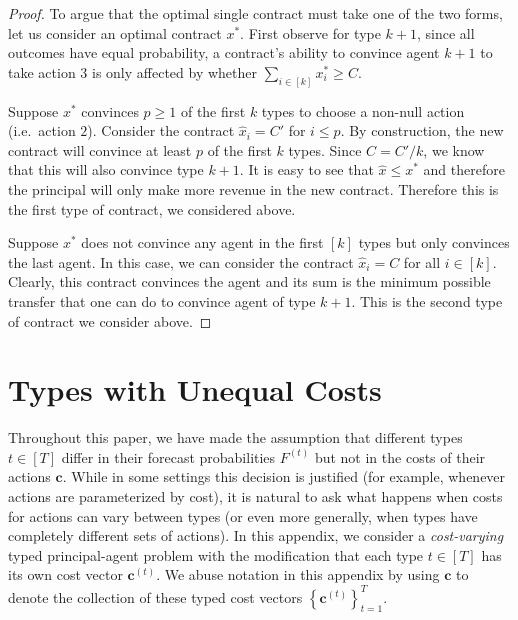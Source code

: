 \documentclass{article}
\newcommand{\CostVector}{\bm{c}}
\newcommand{\TypedCostVector}[1]{\bm{c}^{(#1)}}
\newcommand{\TypedForecastMatrix}[1]{F^{(#1)}}
\begin{document}
\begin{proof}
To argue that the optimal single contract must take one of the two forms, let us consider 
an optimal contract $x^*$. First observe 
for type $k+1$, since all outcomes have equal probability, a contract's ability to convince 
agent $k+1$ to take action $3$ is only affected by whether $\sum_{i \in [k]} x^*_i \geq C$. 

Suppose $x^*$  convinces $p\geq 1$ of the first $k$ types to choose a non-null 
action (i.e.~action $2$). Consider the contract $\hat{x}_i = C'$ for $i \leq p$. 
By construction, the new contract will convince at least $p$ of the first $k$ types. 
Since $C = C'/k$, we know that this will also convince type $k+1$.  It is easy to see that $\hat{x} \leq x^*$ and therefore the principal will only make more revenue in the new contract. Therefore this is the first type of contract, we considered above. 

Suppose $x^*$ does not convince any agent in the first $[k]$ types but only convinces the last agent. 
In this case, we can consider the contract $\hat{x}_i = C$ for all $i \in [k]$. Clearly, this contract convinces the agent and its sum is the minimum possible transfer that one can do to convince agent of type $k+1$.  This is the second type of contract we consider above. 
\end{proof}%
\section{Types with Unequal Costs} \label{apx:nonuniform-costs}

Throughout this paper, we have made the assumption that different types $t \in [T]$ differ in their forecast probabilities $\TypedForecastMatrix{t}$ but not in the costs of their actions $\CostVector$. While in some settings this decision is justified (for example, whenever actions are parameterized by cost), it is natural to ask what happens when costs for actions can vary between types (or even more generally, when types have completely different sets of actions). In this appendix, we consider a \emph{cost-varying} typed principal-agent problem with the modification that each type $t \in [T]$ has its own cost vector $\TypedCostVector{t}$. We abuse notation in this appendix by using $\CostVector$ to denote the collection of these typed cost vectors $\left\{ \TypedCostVector{t} \right\}_{t=1}^T$.
\end{document}
